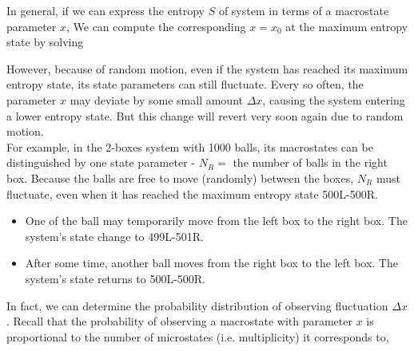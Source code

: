 \documentclass[class=article, crop=false, 12pt]{standalone}
\begin{document}
In general, if we can express the entropy $S$ of system in terms of a macrostate parameter $x$,
We can compute the corresponding $x=x_0$ at the maximum entropy state by solving

However, because of random motion, 
even if the system has reached its maximum entropy state,
its state parameters can still fluctuate.
Every so often, the parameter $x$ may deviate by some small amount $\Delta x$, 
causing the system entering a lower entropy state. 
But this change will revert very soon again due to random motion.\\

For example, in the 2-boxes system with 1000 balls, 
its macrostates can be distinguished by one state parameter - 
$N_R=$ the number of balls in the right box. 
Because the balls are free to move (randomly) between the boxes, 
$N_R$ must fluctuate, even when it has reached the maximum entropy state 500L-500R. 
\begin{itemize}
    \item
    One of the ball may temporarily move from the left box to the right box.
    The system's state change to 499L-501R. 

    \item After some time, another ball moves from the right box to the left box.
    The system's state returns to 500L-500R.
\end{itemize}



In fact, we can determine the probability distribution of observing fluctuation $\Delta x$.
Recall that the probability of observing a macrostate with parameter $x$ 
is proportional to the number of microstates (i.e. multiplicity) it corresponds to,
\end{document}
